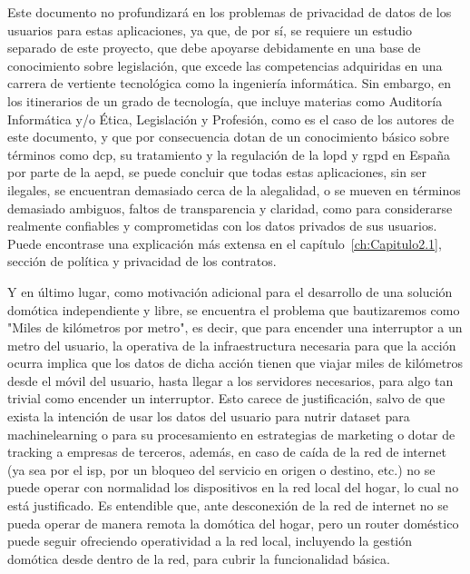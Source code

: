 \vspace{1cm}

Este documento no profundizará en los problemas de privacidad de datos de los usuarios para estas aplicaciones, ya que, de por sí, se requiere un estudio separado de este proyecto, que debe apoyarse debidamente en una base de conocimiento sobre legislación, que excede las competencias adquiridas en una carrera de vertiente tecnológica como la ingeniería informática. Sin embargo, en los itinerarios de un grado de tecnología, que incluye materias como Auditoría Informática y/o Ética, Legislación y Profesión, como es el caso de los autores de este documento, y que por consecuencia dotan de un conocimiento básico sobre términos como \gls{dcp}, su tratamiento y la regulación de la \gls{lopd} y \gls{rgpd} en España por parte de la \gls{aepd}, se puede concluir que todas estas aplicaciones, sin ser ilegales, se encuentran demasiado cerca de la alegalidad, o se mueven en términos demasiado ambiguos, faltos de transparencia y claridad, como para considerarse realmente confiables y comprometidas con los datos privados de sus usuarios. Puede encontrase una explicación más extensa en el capítulo~\ref{ch:Capitulo2.1}, sección de política y privacidad de los contratos.

\vspace{1cm}

Y en último lugar, como motivación adicional para el desarrollo de una solución domótica independiente y libre, se encuentra el problema que bautizaremos como "Miles de kilómetros por metro", es decir, que para encender una interruptor a un metro del usuario, la operativa de la infraestructura necesaria para que la acción ocurra implica que los datos de dicha acción tienen que viajar miles de kilómetros desde el móvil del usuario, hasta llegar a los servidores necesarios, para algo tan trivial como encender un interruptor. Esto carece de justificación, salvo de que exista la intención de usar los datos del usuario para nutrir \gls{dataset} para \gls{machinelearning} o para su procesamiento en estrategias de marketing o dotar de tracking a empresas de terceros, además, en caso de caída de la red de internet (ya sea por el \gls{isp}, por un bloqueo del servicio en origen o destino, etc.) no se puede operar con normalidad los dispositivos en la red local del hogar, lo cual no está justificado. Es entendible que, ante desconexión de la red de internet no se pueda operar de manera remota la domótica del hogar, pero un router doméstico puede seguir ofreciendo operatividad a la red local, incluyendo la gestión domótica desde dentro de la red, para cubrir la funcionalidad básica.

